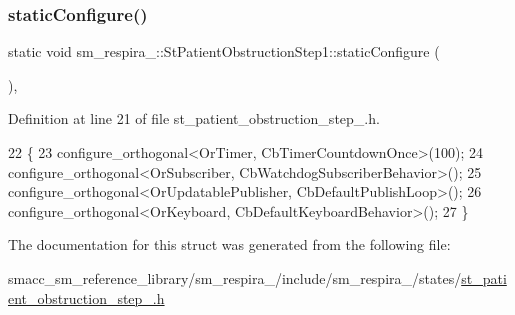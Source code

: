 \subsubsection{\texorpdfstring{static\+Configure()}{staticConfigure()}}
{\footnotesize\ttfamily static void sm\+\_\+respira\+\_\+::\+St\+Patient\+Obstruction\+Step1\+::static\+Configure (\begin{DoxyParamCaption}{ }\end{DoxyParamCaption})\hspace{0.3cm}{\ttfamily [inline]}, {\ttfamily [static]}}



Definition at line 21 of file st\+\_\+patient\+\_\+obstruction\+\_\+step\+\_.\+h.


\begin{DoxyCode}
22     \{
23         configure\_orthogonal<OrTimer, CbTimerCountdownOnce>(100);
24         configure\_orthogonal<OrSubscriber, CbWatchdogSubscriberBehavior>();
25         configure\_orthogonal<OrUpdatablePublisher, CbDefaultPublishLoop>();
26         configure\_orthogonal<OrKeyboard, CbDefaultKeyboardBehavior>();
27     \}
\end{DoxyCode}


The documentation for this struct was generated from the following file\+:\begin{DoxyCompactItemize}
\item 
smacc\+\_\+sm\+\_\+reference\+\_\+library/sm\+\_\+respira\+\_/include/sm\+\_\+respira\+\_/states/\hyperlink{st__patient__obstruction__step__1_8h}{st\+\_\+patient\+\_\+obstruction\+\_\+step\+\_.\+h}\end{DoxyCompactItemize}
